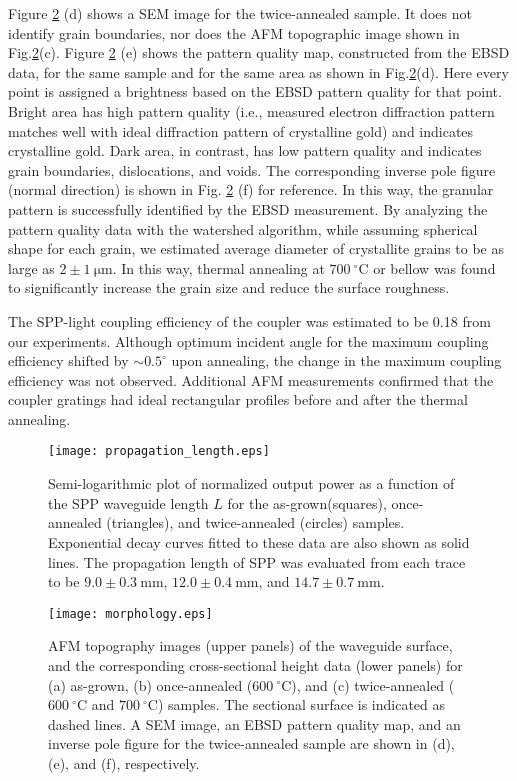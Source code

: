\documentclass[aip,apl,reprint]{revtex4-1}
\begin{document}
Figure \ref{fig:morphology} (d) shows a SEM image for the twice-annealed sample. It does not identify grain boundaries, nor does the AFM topographic image shown in Fig.\ref{fig:morphology}(c).
Figure \ref{fig:morphology} (e) shows the pattern quality map, constructed from the EBSD data, for the same sample and for the same area as shown in Fig.\ref{fig:morphology}(d). Here every point is assigned a brightness based on the EBSD pattern quality for that point. Bright area has high pattern quality (i.e., measured electron diffraction pattern matches well with ideal diffraction pattern of crystalline gold) and indicates crystalline gold. Dark area, in contrast, has low pattern quality and indicates grain boundaries, dislocations, and voids. The corresponding inverse pole figure (normal direction) is shown in Fig. \ref{fig:morphology} (f) for reference. In this way, the granular pattern is successfully identified by the EBSD measurement. By analyzing the pattern quality data with the watershed algorithm\cite{Petr}, while assuming spherical shape for each grain, we estimated average diameter of crystallite grains to be as large as $2\pm1\:\mathrm{\mu m}$. In this way, thermal annealing at $700\:^\circ\mathrm{C}$ or bellow was found to significantly increase the grain size and reduce the surface roughness.

The SPP-light coupling efficiency of the coupler was estimated to be 0.18 from our experiments. Although optimum incident angle for the maximum coupling efficiency shifted by $\sim0.5^\circ$ upon annealing, the change in the maximum coupling efficiency was not observed. Additional AFM measurements confirmed that the coupler gratings had ideal rectangular profiles before and after the thermal annealing. 

 \begin{figure}
    \texttt{[image: propagation\_length.eps]}
    \caption{Semi-logarithmic plot of normalized output power as a function of the SPP waveguide length $L$ for the as-grown(squares), once-annealed (triangles), and twice-annealed (circles) samples. Exponential decay curves fitted to these data are also shown as solid lines. The propagation length of SPP was evaluated from each trace to be $9.0\pm0.3\:\mathrm{mm}$, $12.0\pm0.4\:\mathrm{mm}$, and $14.7\pm0.7\:\mathrm{mm}$.}
       \label{fig:propagation_length}
\end{figure}

  \begin{figure}
    \texttt{[image: morphology.eps]}
        \caption{AFM topography images (upper panels) of the waveguide surface, and the corresponding cross-sectional height data (lower panels) for (a) as-grown, (b) once-annealed ($600\:^\circ\mathrm{C}$), and (c) twice-annealed ($600\:^\circ\mathrm{C}$ and $700\:^\circ\mathrm{C}$) samples. The sectional surface is indicated as dashed lines. A SEM image, an EBSD pattern quality map, and an inverse pole figure for the twice-annealed sample are shown in (d), (e), and (f), respectively.}
    \label{fig:morphology}
\end{figure}
\end{document}
